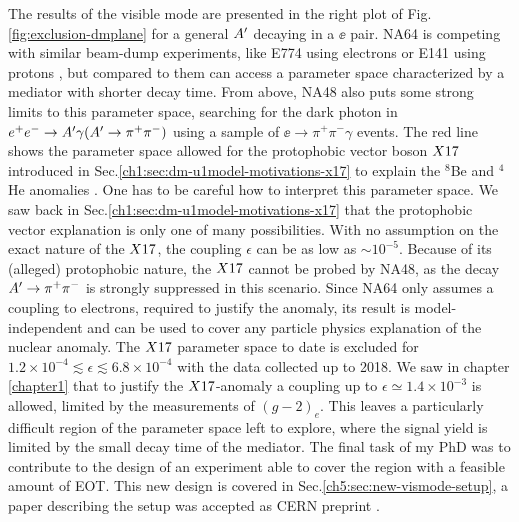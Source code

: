 The results of the visible mode are presented in the right plot of Fig.\ref{fig:exclusion-dmplane} for a general $A'$ decaying in a $\ee$ pair. NA64 is competing with similar beam-dump experiments, like E774 using electrons \cite{PhysRevLett.67.2942} or E141 using protons \cite{PhysRevLett.59.755}, but compared to them can access a parameter space characterized by a mediator with shorter decay time. From above, NA48 also puts some strong limits to this parameter space, searching for the dark photon in $e^+e^- \to A' \gamma (A' \to \pi^+ \pi^-)$ using a sample of $\ee \to \pi^+ \pi^- \gamma$ events. The red line shows the parameter space allowed for the protophobic vector boson $X17$ introduced in Sec.\ref{ch1:sec:dm-u1model-motivations-x17} to explain the $^8$Be and $^4$He anomalies \cite{Krasznahorkay:2015iga,Krasznahorkay:2019lyl}.
One has to be careful how to interpret this parameter space. We saw back in Sec.\ref{ch1:sec:dm-u1model-motivations-x17} that the protophobic vector explanation is only one of many possibilities. With no assumption on the exact nature of the $X17$, the coupling $\epsilon$ can be as low as $\sim 10^{-5}$. Because of its (alleged) protophobic nature, the $X17$ cannot be probed by NA48, as the decay $A' \to \pi^+ \pi^-$ is strongly suppressed in this scenario. Since NA64 only assumes a coupling to electrons, required to justify the anomaly, its result is model-independent and can be used to cover any particle physics explanation of the nuclear anomaly. The $X17$ parameter space to date is excluded for $1.2 \times 10^{-4} \lesssim \epsilon \lesssim 6.8 \times 10^{-4}$ with the data collected up to 2018. We saw in chapter \ref{chapter1} that to justify the $X17$-anomaly a coupling up to $\epsilon \simeq 1.4 \times 10^{-3}$ is allowed, limited by the measurements of $(g-2)_e$. This leaves a particularly difficult region of the parameter space left to explore, where the signal yield is limited by the small decay time of the mediator. The final task of my PhD was to contribute to the design of an experiment able to cover the region with a feasible amount of EOT. This new design is covered in Sec.\ref{ch5:sec:new-vismode-setup}, a paper describing the setup was accepted as CERN preprint \cite{Depero:2020zfy}.

